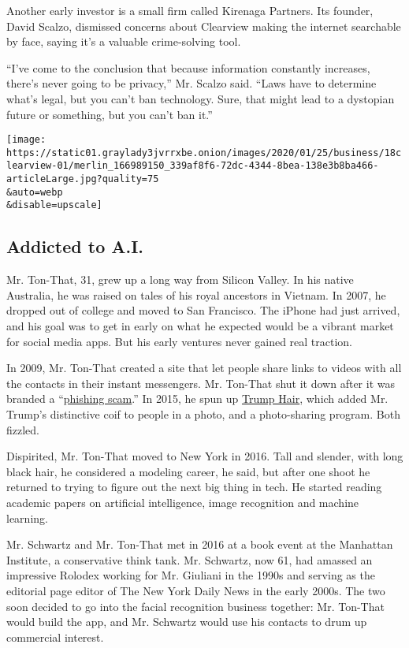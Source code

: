 Another early investor is a small firm called Kirenaga Partners. Its
founder, David Scalzo, dismissed concerns about Clearview making the
internet searchable by face, saying it's a valuable crime-solving tool.

``I've come to the conclusion that because information constantly
increases, there's never going to be privacy,'' Mr. Scalzo said. ``Laws
have to determine what's legal, but you can't ban technology. Sure, that
might lead to a dystopian future or something, but you can't ban it.''

\texttt{[image: https://static01.graylady3jvrrxbe.onion/images/2020/01/25/business/18clearview-01/merlin\_166989150\_339af8f6-72dc-4344-8bea-138e3b8ba466-articleLarge.jpg?quality=75\\\&auto=webp\\\&disable=upscale]}

\hypertarget{addicted-to-ai}{%
\subsection{Addicted to A.I.}\label{addicted-to-ai}}

Mr. Ton-That, 31, grew up a long way from Silicon Valley. In his native
Australia, he was raised on tales of his royal ancestors in Vietnam. In
2007, he dropped out of college and moved to San Francisco. The iPhone
had just arrived, and his goal was to get in early on what he expected
would be a vibrant market for social media apps. But his early ventures
never gained real traction.

In 2009, Mr. Ton-That created a site that let people share links to
videos with all the contacts in their instant messengers. Mr. Ton-That
shut it down after it was branded a
``\href{https://bits.blogs.nytimes3xbfgragh.onion/2009/02/24/viddyho-phishing-scam-hits-gmail/}{phishing
scam}.'' In 2015, he spun up
\href{https://www.148apps.com/app/1040750174/}{Trump Hair}, which added
Mr. Trump's distinctive coif to people in a photo, and a photo-sharing
program. Both fizzled.

Dispirited, Mr. Ton-That moved to New York in 2016. Tall and slender,
with long black hair, he considered a modeling career, he said, but
after one shoot he returned to trying to figure out the next big thing
in tech. He started reading academic papers on artificial intelligence,
image recognition and machine learning.

Mr. Schwartz and Mr. Ton-That met in 2016 at a book event at the
Manhattan Institute, a conservative think tank. Mr. Schwartz, now 61,
had amassed an impressive Rolodex working for Mr. Giuliani in the 1990s
and serving as the editorial page editor of The New York Daily News in
the early 2000s. The two soon decided to go into the facial recognition
business together: Mr. Ton-That would build the app, and Mr. Schwartz
would use his contacts to drum up commercial interest.

